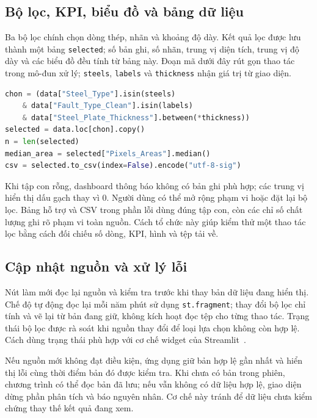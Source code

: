 \documentclass[12pt,a4paper,oneside]{report}
\newcommand{\maCot}[1]{{\urlstyle{tt}\def\UrlBreaks{\do\_\do\/\do\.}\def\UrlBigBreaks{}\nolinkurl{#1}}}
\begin{document}
\subsection{Bộ lọc, KPI, biểu đồ và bảng dữ liệu}

Ba bộ lọc chính chọn dòng thép, nhãn và khoảng độ dày. Kết quả lọc được lưu thành một bảng \maCot{selected}; số bản ghi, số nhãn, trung vị diện tích, trung vị độ dày và các biểu đồ đều tính từ bảng này. Đoạn mã dưới đây rút gọn thao tác trong mô-đun xử lý; \maCot{steels}, \maCot{labels} và \maCot{thickness} nhận giá trị từ giao diện.

\noindent\begin{minipage}{\linewidth}
\begin{lstlisting}[language=Python]
chon = (data["Steel_Type"].isin(steels)
    & data["Fault_Type_Clean"].isin(labels)
    & data["Steel_Plate_Thickness"].between(*thickness))
selected = data.loc[chon].copy()
n = len(selected)
median_area = selected["Pixels_Areas"].median()
csv = selected.to_csv(index=False).encode("utf-8-sig")
\end{lstlisting}
\end{minipage}\par

Khi tập con rỗng, dashboard thông báo không có bản ghi phù hợp; các trung vị hiển thị dấu gạch thay vì 0. Người dùng có thể mở rộng phạm vi hoặc đặt lại bộ lọc. Bảng hỗ trợ và CSV trong phần lỗi dùng đúng tập con, còn các chỉ số chất lượng ghi rõ phạm vi toàn nguồn. Cách tổ chức này giúp kiểm thử một thao tác lọc bằng cách đối chiếu số dòng, KPI, hình và tệp tải về.

\subsection{Cập nhật nguồn và xử lý lỗi}

Nút làm mới đọc lại nguồn và kiểm tra trước khi thay bản dữ liệu đang hiển thị. Chế độ tự động đọc lại mỗi năm phút sử dụng \maCot{st.fragment}; thay đổi bộ lọc chỉ tính và vẽ lại từ bản đang giữ, không kích hoạt đọc tệp cho từng thao tác. Trạng thái bộ lọc được rà soát khi nguồn thay đổi để loại lựa chọn không còn hợp lệ. Cách dùng trạng thái phù hợp với cơ chế widget của Streamlit~\cite{streamlit}.

Nếu nguồn mới không đạt điều kiện, ứng dụng giữ bản hợp lệ gần nhất và hiển thị lỗi cùng thời điểm bản đó được kiểm tra. Khi chưa có bản trong phiên, chương trình có thể đọc bản đã lưu; nếu vẫn không có dữ liệu hợp lệ, giao diện dừng phần phân tích và báo nguyên nhân. Cơ chế này tránh để dữ liệu chưa kiểm chứng thay thế kết quả đang xem.
\end{document}
